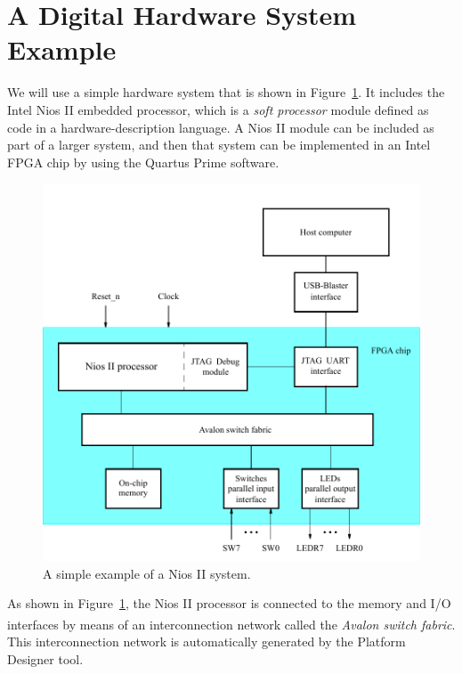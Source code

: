 \documentclass[11pt, twoside, pdftex]{article}
\begin{document}
\section{A Digital Hardware System Example}
We will use a simple hardware system that is shown in Figure~\ref{fig:2}.
It includes the Intel Nios II embedded processor,
which is a {\it soft processor} module defined as code in a hardware-description language.
A Nios II module can be included as part of a larger system, and then that system can
be implemented in an Intel FPGA chip by using the Quartus Prime software.

\begin{figure}[H]
   \begin{center}
      \includegraphics[scale=1]{figures/figure2.pdf}
   \end{center}
   \caption{A simple example of a Nios II system.} 
	\label{fig:2}
\end{figure}

As shown in Figure~\ref{fig:2}, the Nios II processor is connected to the memory and I/O interfaces 
by means of an interconnection network called the {\it Avalon\textsuperscript{\textregistered} switch fabric}.
This interconnection network is automatically generated by the Platform Designer tool.
\end{document}
